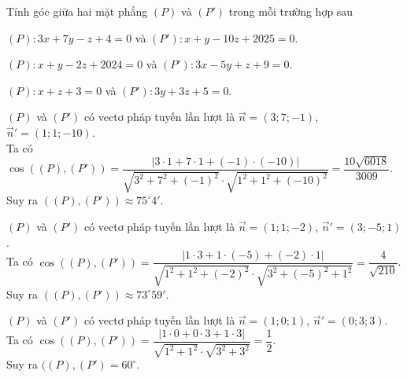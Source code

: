 \begin{bt}%

	Tính góc giữa hai mặt phẳng $(P)$ và $(P')$ trong mỗi trường hợp sau
	\begin{listEX}[1]
		\item $(P)\colon 3x+7y-z+4=0$ và $(P')\colon x+y-10z+2025=0$.
		\item $(P)\colon x+y-2z+2024=0$ và $(P')\colon 3x-5y+z+9=0$.
		\item $(P)\colon x+z+3=0$ và $(P')\colon 3y+3z+5=0$.
	\end{listEX}
	\loigiai
	{
		\begin{listEX}[1]
			\item $(P)$ và $(P')$ có vectơ pháp tuyến lần lượt là $\overrightarrow{n}=(3;7;-1)$, $\overrightarrow{n}'=(1;1;-10)$.\\
			Ta có $\cos\left ((P),(P') \right )=\dfrac{\left |3\cdot 1+7\cdot 1+(-1)\cdot (-10) \right |}{\sqrt{3^2+7^2+(-1)^2}\cdot\sqrt{1^2+1^2+(-10)^2}}=\dfrac{10\sqrt{6018}}{3009}$.\\
			Suy ra $((P),(P'))\approx 75^{\circ}4'$.
			\item $(P)$ và $(P')$ có vectơ pháp tuyến lần lượt là $\overrightarrow{n}=(1;1;-2)$, $\overrightarrow{n}'=(3;-5;1)$.\\
			Ta có $\cos\left ((P),(P') \right )=\dfrac{\left |1\cdot 3+1\cdot (-5)+(-2)\cdot 1 \right |}{\sqrt{1^2+1^2+(-2)^2}\cdot\sqrt{3^2+(-5)^2+1^2}}=\dfrac{4}{\sqrt{210}}$.\\
			Suy ra $((P),(P'))\approx 73^{\circ}59'$.
			\item $(P)$ và $(P')$ có vectơ pháp tuyến lần lượt là $\overrightarrow{n}=(1;0;1)$, $\overrightarrow{n}'=(0;3;3)$.\\
			Ta có $\cos\left ((P),(P') \right )=\dfrac{\left |1\cdot 0+0\cdot 3+1\cdot 3 \right |}{\sqrt{1^2+1^2}\cdot\sqrt{3^2+3^2}}=\dfrac{1}{2}$.\\
			Suy ra $((P),(P')=60^{\circ}$.
		\end{listEX}
	}
\end{bt}

